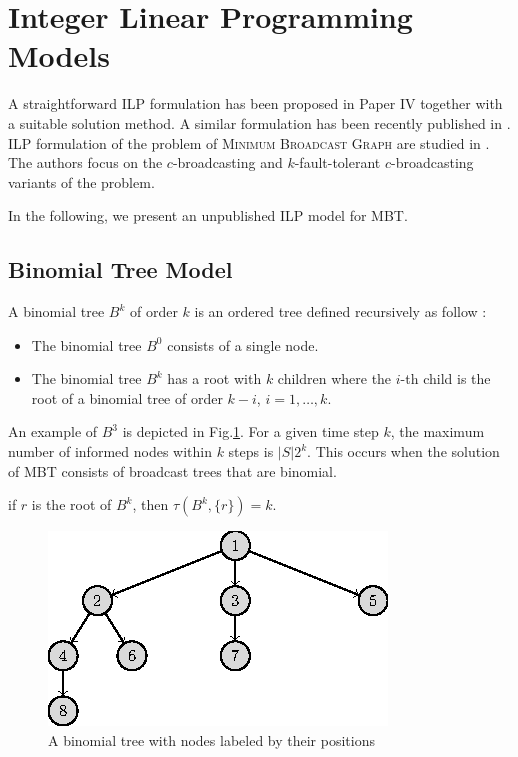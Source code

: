 \section{Integer Linear Programming Models}

A straightforward ILP formulation has been proposed in Paper IV together with a suitable solution method.
A similar formulation has been recently published in \cite{mbtheurXX}.
ILP formulation of the problem of \textsc{Minimum Broadcast Graph} are studied in \cite{McGarvey16}.
The authors focus on the $c$-broadcasting  and $k$-fault-tolerant $c$-broadcasting variants of the problem.

In the following, we present an unpublished ILP model for MBT.

\subsection{Binomial Tree Model}

A binomial tree $B^k$ of order $k$ is an ordered tree defined recursively as follow \cite{cormen01}:
\begin{itemize}
\item The binomial tree $B^0$ consists of a single node.
\item The binomial tree $B^k$ has a root with $k$ children where the $i$-th child is the root of a binomial tree of order $k-i$, $i=1,\dots,k$.
\end{itemize}
An example of $B^3$ is depicted in Fig.\ref{fig:beta}.
For a given time step $k$, the maximum number of informed nodes within $k$ steps is $|S|2^k$.
This occurs when the solution of MBT consists of broadcast trees that are binomial.
\begin{observation}
\label{obs:btspread}
if $r$ is the root of $B^k$, then $\tau(B^k,\{r\})=k$.
\end{observation}
\begin{figure}
\centering
	\includegraphics{figurer/btindex.eps}
\caption{A binomial tree with nodes labeled by their positions}
\label{fig:beta}
\end{figure}


